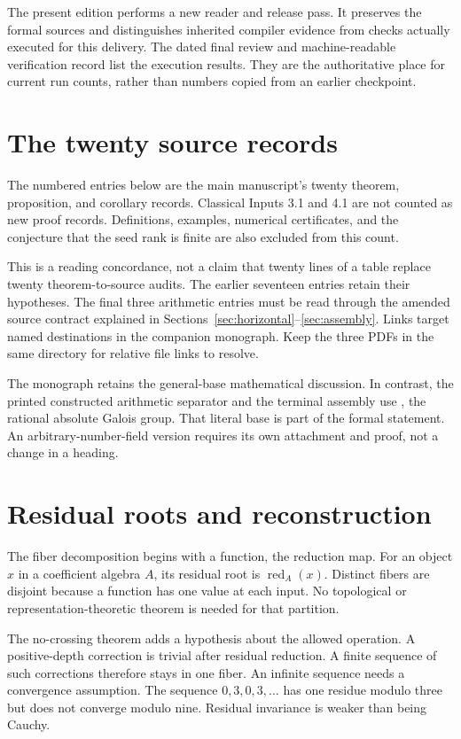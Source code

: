 The present edition performs a new reader and release pass. It preserves the
formal sources and distinguishes inherited compiler evidence from checks actually
executed for this delivery. The dated final review and machine-readable verification
record list the execution results. They are the authoritative place for current
run counts, rather than numbers copied from an earlier checkpoint.

\clearpage
\section{The twenty source records}
\label{sec:register}
The numbered entries below are the main manuscript's twenty theorem, proposition,
and corollary records. Classical Inputs 3.1 and 4.1 are not counted as new proof
records. Definitions, examples, numerical certificates, and the conjecture that the seed rank is finite are also excluded from this count.

This is a reading concordance, not a claim that twenty lines of a table replace
twenty theorem-to-source audits. The earlier seventeen entries retain their
hypotheses. The final three arithmetic entries must be read through the amended
source contract explained in Sections~\ref{sec:horizontal}--\ref{sec:assembly}.
Links target named destinations in the companion monograph. Keep the three PDFs
in the same directory for relative file links to resolve.

The monograph retains the general-base mathematical discussion. In contrast, the
printed constructed arithmetic separator and the terminal assembly use
, the rational absolute Galois group. That literal base is part of the
formal statement. An arbitrary-number-field version requires its own attachment
and proof, not a change in a heading.

\clearpage
\section{Residual roots and reconstruction}
The fiber decomposition begins with a function, the reduction map. For an object
$x$ in a coefficient algebra $A$, its residual root is $\operatorname{red}_A(x)$.
Distinct fibers are disjoint because a function has one value at each input.
No topological or representation-theoretic theorem is needed for that partition.

The no-crossing theorem adds a hypothesis about the allowed operation. A
positive-depth correction is trivial after residual reduction. A finite sequence
of such corrections therefore stays in one fiber. An infinite sequence needs a
convergence assumption. The sequence $0,3,0,3,\ldots$ has one residue modulo three
but does not converge modulo nine. Residual invariance is weaker than being Cauchy.

